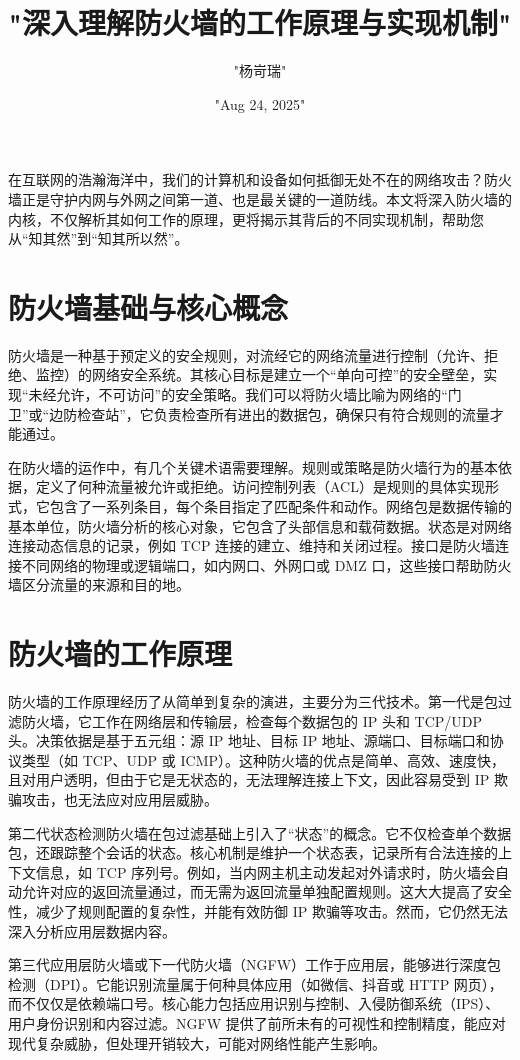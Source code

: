 \title{"深入理解防火墙的工作原理与实现机制"}
\author{"杨岢瑞"}
\date{"Aug 24, 2025"}
\maketitle
在互联网的浩瀚海洋中，我们的计算机和设备如何抵御无处不在的网络攻击？防火墙正是守护内网与外网之间第一道、也是最关键的一道防线。本文将深入防火墙的内核，不仅解析其如何工作的原理，更将揭示其背后的不同实现机制，帮助您从“知其然”到“知其所以然”。\par
\chapter{防火墙基础与核心概念}
防火墙是一种基于预定义的安全规则，对流经它的网络流量进行控制（允许、拒绝、监控）的网络安全系统。其核心目标是建立一个“单向可控”的安全壁垒，实现“未经允许，不可访问”的安全策略。我们可以将防火墙比喻为网络的“门卫”或“边防检查站”，它负责检查所有进出的数据包，确保只有符合规则的流量才能通过。\par
在防火墙的运作中，有几个关键术语需要理解。规则或策略是防火墙行为的基本依据，定义了何种流量被允许或拒绝。访问控制列表（ACL）是规则的具体实现形式，它包含了一系列条目，每个条目指定了匹配条件和动作。网络包是数据传输的基本单位，防火墙分析的核心对象，它包含了头部信息和载荷数据。状态是对网络连接动态信息的记录，例如 TCP 连接的建立、维持和关闭过程。接口是防火墙连接不同网络的物理或逻辑端口，如内网口、外网口或 DMZ 口，这些接口帮助防火墙区分流量的来源和目的地。\par
\chapter{防火墙的工作原理}
防火墙的工作原理经历了从简单到复杂的演进，主要分为三代技术。第一代是包过滤防火墙，它工作在网络层和传输层，检查每个数据包的 IP 头和 TCP/UDP 头。决策依据是基于五元组：源 IP 地址、目标 IP 地址、源端口、目标端口和协议类型（如 TCP、UDP 或 ICMP）。这种防火墙的优点是简单、高效、速度快，且对用户透明，但由于它是无状态的，无法理解连接上下文，因此容易受到 IP 欺骗攻击，也无法应对应用层威胁。\par
第二代状态检测防火墙在包过滤基础上引入了“状态”的概念。它不仅检查单个数据包，还跟踪整个会话的状态。核心机制是维护一个状态表，记录所有合法连接的上下文信息，如 TCP 序列号。例如，当内网主机主动发起对外请求时，防火墙会自动允许对应的返回流量通过，而无需为返回流量单独配置规则。这大大提高了安全性，减少了规则配置的复杂性，并能有效防御 IP 欺骗等攻击。然而，它仍然无法深入分析应用层数据内容。\par
第三代应用层防火墙或下一代防火墙（NGFW）工作于应用层，能够进行深度包检测（DPI）。它能识别流量属于何种具体应用（如微信、抖音或 HTTP 网页），而不仅仅是依赖端口号。核心能力包括应用识别与控制、入侵防御系统（IPS）、用户身份识别和内容过滤。NGFW 提供了前所未有的可视性和控制精度，能应对现代复杂威胁，但处理开销较大，可能对网络性能产生影响。\par

